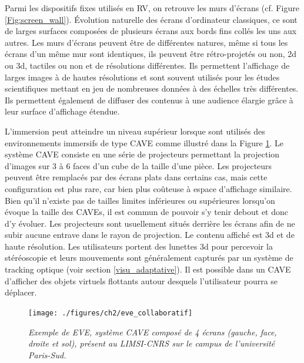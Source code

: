 Parmi les dispositifs fixes utilisés en RV, on retrouve les murs d'écrans (cf. Figure \ref{Fig:screen_wall}). Évolution naturelle des écrans d'ordinateur classiques, ce sont de larges surfaces composées de plusieurs écrans aux bords fins collés les uns aux autres. Les murs d'écrans peuvent être de différentes natures, même si tous les écrans d'un même mur sont identiques, ils peuvent être rétro-projetés ou non, 2d ou 3d, tactiles ou non et de résolutions différentes. Ils permettent l'affichage de larges images à de hautes résolutions et sont souvent utilisés pour les études scientifiques mettant en jeu de nombreuses données à des échelles très différentes. Ils permettent également de diffuser des contenus à une audience élargie grâce à leur surface d'affichage étendue.

L'immersion peut atteindre un niveau supérieur lorsque sont utilisés des environnements immersifs de type CAVE \cite{cruz-neira_cave:_1992} comme illustré dans la Figure \ref{Fig:eve_collaboratif}. Le système CAVE consiste en une série de projecteurs permettant la projection d'images sur 3 à 6 faces d'un cube de la taille d'une pièce. Les projecteurs peuvent être remplacés par des écrans plats dans certains cas, mais cette configuration est plus rare, car bien plus coûteuse à espace d'affichage similaire. Bien qu'il n'existe pas de tailles limites inférieures ou supérieures lorsqu'on évoque la taille des CAVEs, il est commun de pouvoir s'y tenir debout et donc d'y évoluer. Les projecteurs sont usuellement situés derrière les écrans afin de ne subir aucune entrave dans le rayon de projection. Le contenu affiché est 3d et de haute résolution. Les utilisateurs portent des lunettes 3d pour percevoir la stéréoscopie et leurs mouvements sont généralement capturés par un système de tracking optique (voir section \ref{visu_adaptative}). Il est possible dans un CAVE d'afficher des objets virtuels flottants autour desquels l'utilisateur pourra se déplacer.

\begin{figure}[!htb]
  \centering
  {\texttt{[image: ./figures/ch2/eve\_collaboratif]}}
    \caption[Système CAVE, EVE du LIMSI-CNRS.]{{\it Exemple de EVE, système CAVE composé de 4 écrans (gauche, face, droite et sol), présent au LIMSI-CNRS sur le campus de l'université Paris-Sud.}}
  \label{Fig:eve_collaboratif}
\end{figure}

